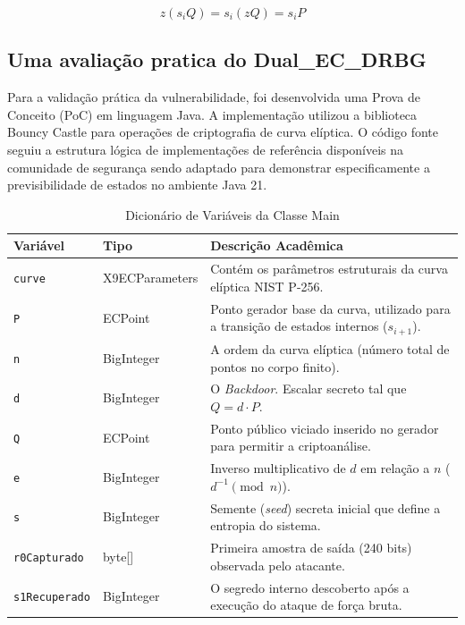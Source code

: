         \[ z(s_i Q) = s_i (z Q) = s_i P \]

            \subsection{Uma avaliação pratica do Dual\_EC\_DRBG}

                Para a validação prática da vulnerabilidade, 
                foi desenvolvida uma Prova de Conceito (PoC) em linguagem Java. 
                A implementação utilizou a biblioteca Bouncy Castle para operações de criptografia de curva elíptica. 
                O código fonte seguiu a estrutura lógica de implementações de referência disponíveis na comunidade de segurança %
                sendo adaptado para demonstrar especificamente a previsibilidade de estados no ambiente Java 21.

                \begin{table}[!htbp]
                    \centering
                    \caption{Dicionário de Variáveis da Classe Main}
                    \label{tab:vars_main}
                    \begin{tabular}{|l|l|p{8cm}|}
                        \hline
                        \textbf{Variável} & \textbf{Tipo} & \textbf{Descrição Acadêmica} \\ \hline
                        \texttt{curve} & X9ECParameters & Contém os parâmetros estruturais da curva elíptica NIST P-256. \\ \hline
                        \texttt{P} & ECPoint & Ponto gerador base da curva, utilizado para a transição de estados internos ($s_{i+1}$). \\ \hline
                        \texttt{n} & BigInteger & A ordem da curva elíptica (número total de pontos no corpo finito). \\ \hline
                        \texttt{d} & BigInteger & O \textit{Backdoor}. Escalar secreto tal que $Q = d \cdot P$. \\ \hline
                        \texttt{Q} & ECPoint & Ponto público viciado inserido no gerador para permitir a criptoanálise. \\ \hline
                        \texttt{e} & BigInteger & Inverso multiplicativo de $d$ em relação a $n$ ($d^{-1} \pmod n$). \\ \hline
                        \texttt{s} & BigInteger & Semente (\textit{seed}) secreta inicial que define a entropia do sistema. \\ \hline
                        \texttt{r0Capturado} & byte[] & Primeira amostra de saída (240 bits) observada pelo atacante. \\ \hline
                        \texttt{s1Recuperado} & BigInteger & O segredo interno descoberto após a execução do ataque de força bruta. \\ \hline
                    \end{tabular}
                \end{table}

